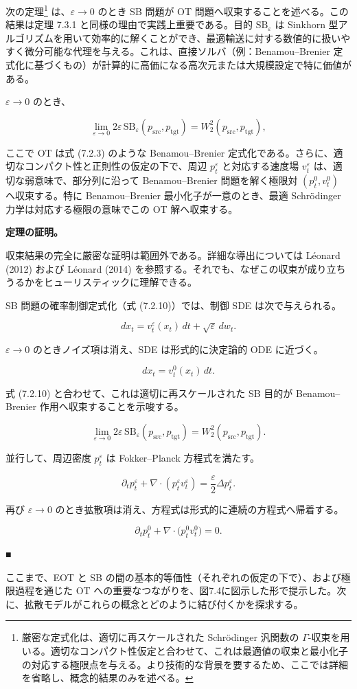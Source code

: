 次の定理\footnote{厳密な定式化は、適切に再スケールされた Schrödinger 汎関数の $\Gamma$-収束を用いる。適切なコンパクト性仮定と合わせて、これは最適値の収束と最小化子の対応する極限点を与える。より技術的な背景を要するため、ここでは詳細を省略し、概念的結果のみを述べる。} は、$\varepsilon\to 0$ のとき SB 問題が OT 問題へ収束することを述べる。この結果は定理 7.3.1 と同様の理由で実践上重要である。目的 $\mathrm{SB}_\varepsilon$ は Sinkhorn 型アルゴリズムを用いて効率的に解くことができ、最適輸送に対する数値的に扱いやすく微分可能な代理を与える。これは、直接ソルバ（例：Benamou–Brenier 定式化に基づくもの）が計算的に高価になる高次元または大規模設定で特に価値がある。

\begin{propositionbox}
$\varepsilon\to 0$ のとき、

\[
\lim_{\varepsilon\to 0}2\varepsilon\,\mathrm{SB}_\varepsilon(p_{\mathrm{src}},p_{\mathrm{tgt}})=W_2^2(p_{\mathrm{src}},p_{\mathrm{tgt}}),
\]

ここで OT は式 (7.2.3) のような Benamou–Brenier 定式化である。さらに、適切なコンパクト性と正則性の仮定の下で、周辺 $p_t^\varepsilon$ と対応する速度場 $v_t^\varepsilon$ は、適切な弱意味で、部分列に沿って Benamou–Brenier 問題を解く極限対 $(p_t^0,v_t^0)$ へ収束する。特に Benamou–Brenier 最小化子が一意のとき、最適 Schrödinger 力学は対応する極限の意味でこの OT 解へ収束する。
\end{propositionbox}


\textbf{定理の証明。}

収束結果の完全に厳密な証明は範囲外である。詳細な導出については Léonard (2012) および Léonard (2014) を参照する。それでも、なぜこの収束が成り立ちうるかをヒューリスティックに理解できる。

SB 問題の確率制御定式化（式 (7.2.10)）では、制御 SDE は次で与えられる。

\[
dx_t=v_t^\varepsilon(x_t)\,dt+\sqrt{\varepsilon}\,dw_t.
\]


$\varepsilon\to 0$ のときノイズ項は消え、SDE は形式的に決定論的 ODE に近づく。

\[
dx_t=v_t^0(x_t)\,dt.
\]


式 (7.2.10) と合わせて、これは適切に再スケールされた SB 目的が Benamou–Brenier 作用へ収束することを示唆する。

\[
\lim_{\varepsilon\to 0}2\varepsilon\,\mathrm{SB}_\varepsilon(p_{\mathrm{src}},p_{\mathrm{tgt}})=W_2^2(p_{\mathrm{src}},p_{\mathrm{tgt}}).
\]


並行して、周辺密度 $p_t^\varepsilon$ は Fokker–Planck 方程式を満たす。

\[
\partial_t p_t^\varepsilon+\nabla\cdot(p_t^\varepsilon v_t^\varepsilon)=\frac{\varepsilon}{2}\Delta p_t^\varepsilon.
\]


再び $\varepsilon\to 0$ のとき拡散項は消え、方程式は形式的に連続の方程式へ帰着する。

\[
\partial_t p_t^0+\nabla\cdot\bigl(p_t^0 v_t^0\bigr)=0.
\]


■

ここまで、EOT と SB の間の基本的等価性（それぞれの仮定の下で）、および極限過程を通じた OT への重要なつながりを、図7.4に図示した形で提示した。次に、拡散モデルがこれらの概念とどのように結び付くかを探求する。


